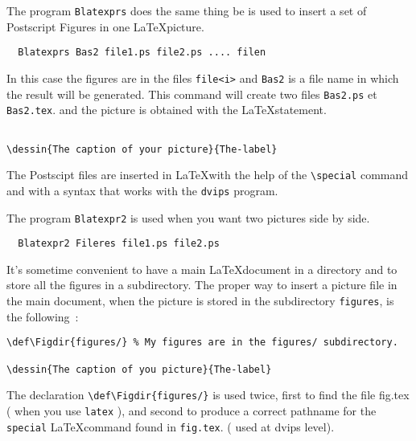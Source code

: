 The program \verb+Blatexprs+ does the same thing be is used to insert
a set of Postscript Figures in one \LaTeX picture.

\begin{verbatim}
  Blatexprs Bas2 file1.ps file2.ps .... filen
\end{verbatim}
In this case the figures are in the files \verb+file<i>+ and
\verb+Bas2+ is a file name in which the result will be generated.
This command will create two files \verb+Bas2.ps+ et \verb+Bas2.tex+.
and the picture is obtained with the \LaTeX statement.
\begin{verbatim}

\dessin{The caption of your picture}{The-label}
\end{verbatim}
The Postscipt files are inserted in \LaTeX with the help of the
\verb+\special+ command and with a syntax that works with the
\verb+dvips+ program.

The program \verb+Blatexpr2+ is used when you want two pictures side
by side.
\begin{verbatim}
  Blatexpr2 Fileres file1.ps file2.ps 
\end{verbatim}
\def\exemple{d7-12}

\dessin{Blatexp2 Example}{\exemple}

It's sometime convenient to have a main \LaTeX document in a directory
and to store all the figures in a subdirectory. The proper way to
insert a  picture file in the main document, when the picture 
is stored in the subdirectory \verb+figures+, is the following~:

\begin{verbatim}
\def\Figdir{figures/} % My figures are in the figures/ subdirectory.

\dessin{The caption of you picture}{The-label}
\end{verbatim}

The declaration \verb+\def\Figdir{figures/}+ is used twice, first to
find the file fig.tex ( when you use \verb+latex+ ), and
 second to produce a correct pathname for the
\verb+special+ \LaTeX command  found in \verb+fig.tex+. ( used at
dvips level).







